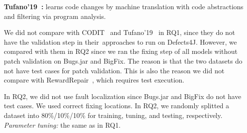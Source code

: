 {\bf Tufano'19~\cite{tufano2019learning}:} learns code changes by
machine translation with code abstractions and
filtering via program analysis.

We did not compare with CODIT~\cite{chakrabortycodit} and
Tufano'19~\cite{tufano2019learning} in RQ1, since they do not have
the validation step in their~approaches to run on Defects4J.
%
However, we compared {\tool} with them in RQ2 since we ran the fixing
step of all models without patch validation on Bugs.jar and
BigFix. The reason is that the two datasets do not have test cases for
patch validation. This is also the reason we did not compare with
RewardRepair~\cite{monperrus-icse22}, which requires test execution.






In RQ2, we did not use fault localization since Bugs.jar and
BigFix do not have test cases. We used correct fixing locations.  In
RQ2, we randomly splitted a dataset into
80\%/10\%/10\% for training, tuning, and testing,
respectively.
{\em Parameter tuning:} the same as in RQ1.


